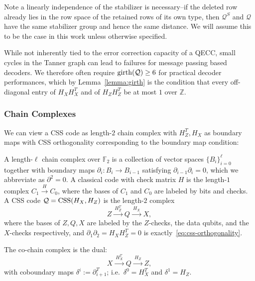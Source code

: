Note a linearly independence of the stabilizer is necessary--if the deleted row already lies in the row space of the retained rows of its own type, then $\mathcal Q^S$ and $\mathcal Q$ have the same stabilizer group and hence the same distance. We will assume this to be the case in this work unless otherwise specified.

While not inherently tied to the error correction capacity of a QECC, small cycles in the Tanner graph can lead to failures for  message passing based decoders. We therefore often require $\mathrm{girth}(\mathcal{Q})\geq 6$ for practical decoder performances, which by Lemma~\ref{lemma:girth} is the condition that every off-diagonal entry of $H_XH_X^T$ and of $H_ZH_Z^T$ be at most $1$ over $\mathbb Z$.


\subsubsection{Chain Complexes}\label{sssec:chain-complex}

We can view a CSS code as length-$2$
chain complex with $H_Z^T,H_X $ as boundary maps with CSS orthogonality corresponding to the boundary map condition:

\begin{definition}\label{def:chain-complex}
A length-$\ell$ chain complex over $\mathbb F_2$ is a collection of vector spaces $\{B_i\}_{i=0}^\ell$ together with boundary maps $\partial_i : B_i \to B_{i-1}$ satisfying $\partial_{i-1}\partial_i = 0$, which we abbreviate as $\partial^2 = 0$. A classical code with check matrix $H$ is the length-$1$ complex $C_1 \xrightarrow{H} C_0$, where the bases of $C_1$ and $C_0$ are labeled by bits and checks. A CSS code $\mathcal Q = \mathrm{CSS}(H_X, H_Z)$ is the length-$2$ complex
\begin{equation}\label{eq:css-complex}
    Z \xrightarrow{\ H_Z^T\ } Q \xrightarrow{\ H_X\ } X,
\end{equation}
where the bases of $Z,Q,X$ are labeled by the $Z$-checks, the data qubits, and the $X$-checks respectively, and $\partial_1\partial_2 = H_XH_Z^T = 0$ is exactly~\eqref{eq:css-orthogonality}.

The co-chain complex is the dual:
\begin{equation}\label{eq:css-cocomplex}
    X \xrightarrow{\ H_X^T\ } Q \xrightarrow{\ H_Z\ } Z,
\end{equation}
with coboundary maps $\delta^{i} := \partial_{i+1}^T$; i.e.\ $\delta^0 = H_X^T$ and
$\delta^1 = H_Z$. 
\end{definition}

